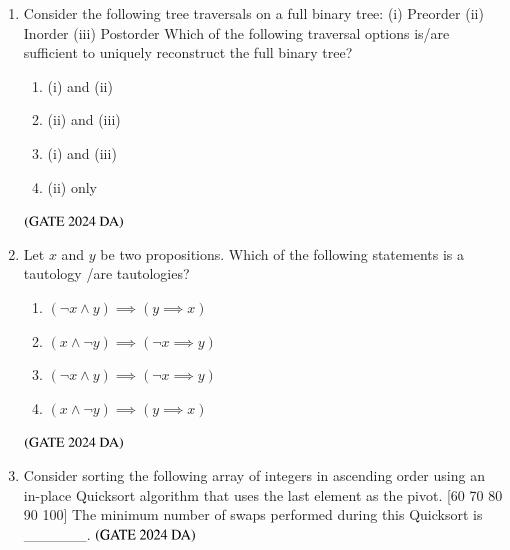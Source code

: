 \documentclass[journal,12pt,onecolumn]{IEEEtran}
\theoremstyle{remark}
\begin{document}
\begin{enumerate}[resume]
\item Consider the following tree traversals on a full binary tree:
(i) Preorder (ii) Inorder (iii) Postorder
Which of the following traversal options is/are sufficient to uniquely reconstruct the full binary tree?
\begin{multicols}{4}
\begin{enumerate}
\item (i) and (ii)
\item (ii) and (iii)
\item (i) and (iii)
\item (ii) only
\end{enumerate}
\end{multicols}
\hfill $\left(\text{GATE 2024 DA}\right)$


\item Let $x$ and $y$ be two propositions. Which of the following statements is a tautology /are tautologies?
\begin{multicols}{2}
\begin{enumerate}
\item $(\neg x \land y ) \implies (y \implies x)$
\item $(x \land \neg y ) \implies (\neg x \implies y)$
\item $(\neg x \land y ) \implies (\neg x \implies y)$
\item $(x \land \neg y ) \implies (y \implies x)$
\end{enumerate}
\end{multicols}
\hfill $\left(\text{GATE 2024 DA}\right)$


\item Consider sorting the following array of integers in ascending order using an in-place Quicksort algorithm that uses the last element as the pivot.
[60 70 80 90 100]
The minimum number of swaps performed during this Quicksort is \_\_\_\_\_\_.
\hfill $\left(\text{GATE 2024 DA}\right)$



\end{enumerate}
\end{document}
